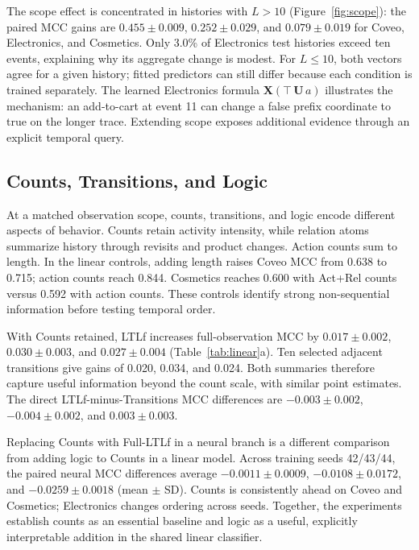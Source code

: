 \documentclass[sigconf,anonymous,nonacm]{acmart}
\newif\ifrevisions
\newcommand{\rev}[1]{\ifrevisions\textcolor{red}{#1}\else#1\fi}
\newenvironment{revblock}{\begingroup\ifrevisions\color{red}\fi}{\endgroup}
\begin{document}
\begin{revblock}
The scope effect is concentrated in histories with $L>10$ (Figure~\ref{fig:scope}): the paired MCC gains are $0.455\pm0.009$, $0.252\pm0.029$, and $0.079\pm0.019$ for Coveo, Electronics, and Cosmetics. Only 3.0\% of Electronics test histories exceed ten events, explaining why its aggregate change is modest. For $L\leq10$, both vectors agree for a given history; fitted predictors can still differ because each condition is trained separately. The learned Electronics formula $\mathbf{X}(\top\,\mathbf{U}\,a)$ illustrates the mechanism: an add-to-cart at event 11 can change a false prefix coordinate to true on the longer trace. Extending scope exposes additional evidence through an explicit temporal query.

\subsection{Counts, Transitions, and Logic}
\label{sec:controls}
At a matched observation scope, counts, transitions, and logic encode different aspects of behavior. Counts retain activity intensity, while relation atoms summarize history through revisits and product changes. Action counts sum to length. In the linear controls, adding length raises Coveo MCC from 0.638 to 0.715; action counts reach 0.844. Cosmetics reaches 0.600 with Act+Rel counts versus 0.592 with action counts. These controls identify strong non-sequential information before testing temporal order.

\begin{table}[t]
\centering\small\setlength{\tabcolsep}{4pt}
\caption{\rev{Count and temporal summaries with matched linear predictors, estimate $\pm$ bootstrap SE. Every row includes the raw prefix. LTLf and Transitions each add ten Boolean coordinates; Both adds both sets. Counts includes length in (a); all histories have length ten in (b). Bold marks the largest point estimate within each panel.}}
\label{tab:linear}

\end{table}

With Counts retained, LTLf increases full-observation MCC by $0.017\pm0.002$, $0.030\pm0.003$, and $0.027\pm0.004$ (Table~\ref{tab:linear}a). Ten selected adjacent transitions give gains of 0.020, 0.034, and 0.024. Both summaries therefore capture useful information beyond the count scale, with similar point estimates. The direct LTLf-minus-Transitions MCC differences are $-0.003\pm0.002$, $-0.004\pm0.002$, and $0.003\pm0.003$.

Replacing Counts with Full-LTLf in a neural branch is a different comparison from adding logic to Counts in a linear model. Across training seeds 42/43/44, the paired neural MCC differences average $-0.0011\pm0.0009$, $-0.0108\pm0.0172$, and $-0.0259\pm0.0018$ (mean $\pm$ SD). Counts is consistently ahead on Coveo and Cosmetics; Electronics changes ordering across seeds. Together, the experiments establish counts as an essential baseline and logic as a useful, explicitly interpretable addition in the shared linear classifier.


\end{revblock}
\end{document}
